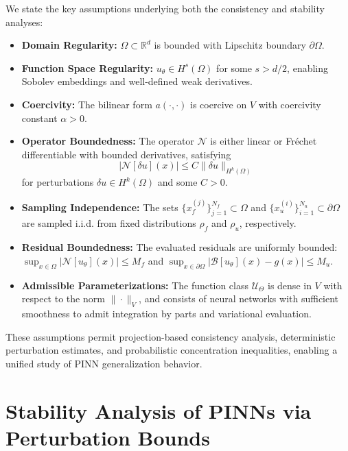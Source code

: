 \documentclass[11pt, a4paper]{article}
\begin{document}
We state the key assumptions underlying both the consistency and stability analyses:

\begin{itemize}
\item[(A1)] \textbf{Domain Regularity:} $\Omega \subset \mathbb{R}^d$ is bounded with Lipschitz boundary $\partial\Omega$.

\item[(A2)] \textbf{Function Space Regularity:} $u_\theta \in H^s(\Omega)$ for some $s > d/2$, enabling Sobolev embeddings and well-defined weak derivatives.

\item[(A3)] \textbf{Coercivity:} The bilinear form $a(\cdot, \cdot)$ is coercive on $V$ with coercivity constant $\alpha > 0$.

\item[(A4)] \textbf{Operator Boundedness:} The operator $\mathcal{N}$ is either linear or Fréchet differentiable with bounded derivatives, satisfying
\[
|\mathcal{N}[\delta u](x)| \leq C \| \delta u \|_{H^k(\Omega)}
\]
for perturbations $\delta u \in H^k(\Omega)$ and some $C > 0$.

\item[(A5)] \textbf{Sampling Independence:} The sets $\{x_f^{(j)}\}_{j=1}^{N_f} \subset \Omega$ and $\{x_u^{(i)}\}_{i=1}^{N_u} \subset \partial \Omega$ are sampled i.i.d. from fixed distributions $\rho_f$ and $\rho_u$, respectively.

\item[(A6)] \textbf{Residual Boundedness:} The evaluated residuals are uniformly bounded: $\sup_{x \in \Omega} |\mathcal{N}[u_\theta](x)| \leq M_f$ and $\sup_{x \in \partial \Omega} |\mathcal{B}[u_\theta](x) - g(x)| \leq M_u$.

\item[(A7)] \textbf{Admissible Parameterizations:} The function class $\mathcal{U}_\Theta$ is dense in $V$ with respect to the norm $\| \cdot \|_V$, and consists of neural networks with sufficient smoothness to admit integration by parts and variational evaluation.
\end{itemize}

These assumptions permit projection-based consistency analysis, deterministic perturbation estimates, and probabilistic concentration inequalities, enabling a unified study of PINN generalization behavior.

%
\section{Stability Analysis of PINNs via Perturbation Bounds}
\end{document}

